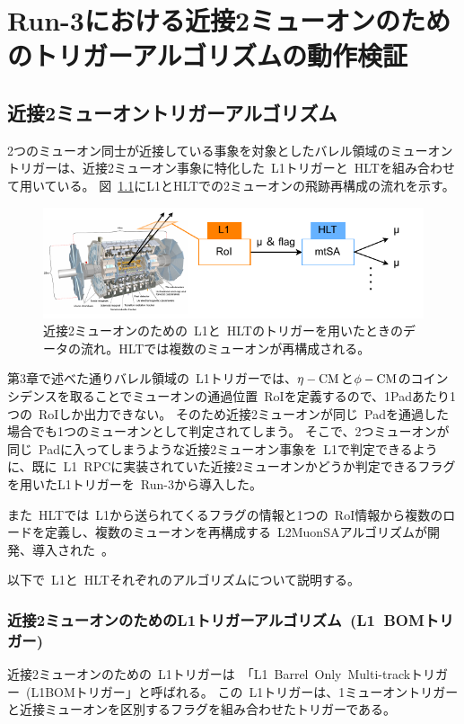 \chapter{Run-3における近接2ミューオンのためのトリガーアルゴリズムの動作検証}\label{chapter4}

\section{近接2ミューオントリガーアルゴリズム}\label{chapter4-1}
2つのミューオン同士が近接している事象を対象としたバレル領域のミューオントリガーは、近接2ミューオン事象に特化した~L1トリガーと~HLTを組み合わせて用いている。
図~\ref{fig:4-1}にL1とHLTでの2ミューオンの飛跡再構成の流れを示す。

\begin{figure}[H]
    \centering
    \includegraphics[clip, width=13cm]{fig/4/closebyMuonFlow.pdf}
    \caption{近接2ミューオンのための~L1と~HLTのトリガーを用いたときのデータの流れ。HLTでは複数のミューオンが再構成される。}
    \label{fig:4-1}
\end{figure}

第3章で述べた通りバレル領域の~L1トリガーでは、$\eta-\rm{CM}$と$\phi-\rm{CM}$のコインシデンスを取ることでミューオンの通過位置~RoIを定義するので、1Padあたり1つの~RoIしか出力できない。
そのため近接2ミューオンが同じ~Padを通過した場合でも1つのミューオンとして判定されてしまう。
そこで、2つミューオンが同じ~Padに入ってしまうような近接2ミューオン事象を~L1で判定できるように、既に~L1~RPCに実装されていた近接2ミューオンかどうか判定できるフラグを用いたL1トリガーを~Run-3から導入した。

また~HLTでは~L1から送られてくるフラグの情報と1つの~RoI情報から複数のロードを定義し、複数のミューオンを再構成する~L2MuonSAアルゴリズムが開発、導入された~\cite{article:taniguchi}。

以下で~L1と~HLTそれぞれのアルゴリズムについて説明する。


\subsection{近接2ミューオンのためのL1トリガーアルゴリズム~(L1~BOMトリガー)}\label{chapter4-1-1}
近接2ミューオンのための~L1トリガーは~「L1~Barrel~Only~Multi-trackトリガー~(L1BOMトリガー」と呼ばれる。
この~L1トリガーは、1ミューオントリガーと近接ミューオンを区別するフラグを組み合わせたトリガーである。

